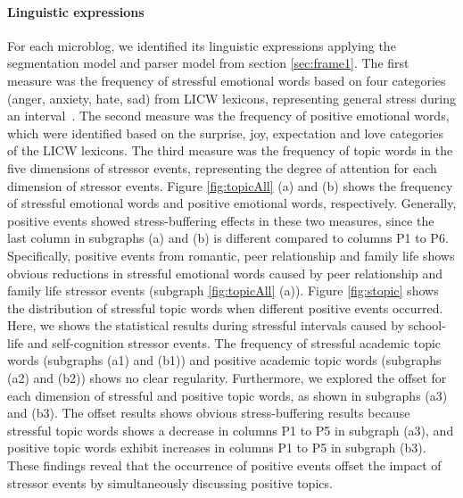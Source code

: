 \paragraph{\textbf{Linguistic expressions}}
For each microblog, we identified its linguistic expressions
applying the segmentation model and parser model from section \ref{sec:frame1}.
The first measure was the frequency of stressful emotional words based on four categories
(anger, anxiety, hate, sad) from LICW lexicons, representing general stress during an interval~\citep{Tausczik2010The}.
The second measure was the frequency of positive emotional words,
which were identified based on the surprise, joy, expectation and love categories of the LICW lexicons.
The third measure was the frequency of topic words in the five dimensions of stressor events,
representing the degree of attention for each dimension of stressor events.
Figure \ref{fig:topicAll} (a) and (b) shows the frequency of stressful emotional words and positive emotional words, respectively.
Generally, positive events showed stress-buffering effects in these two measures,
since the last column in subgraphs (a) and (b) is different compared to columns P1 to P6.
Specifically, positive events from romantic, peer relationship and family life shows obvious
reductions in stressful emotional words caused by
peer relationship and family life stressor events (subgraph \ref{fig:topicAll} (a)).
Figure \ref{fig:stopic} shows the distribution of stressful topic words when different positive events occurred.
Here, we shows the statistical results during stressful intervals caused by school-life and self-cognition stressor events.
The frequency of stressful academic topic words (subgraphs (a1) and (b1))
and positive academic topic words (subgraphs (a2) and (b2)) shows no clear regularity.
Furthermore, we explored the offset for each dimension of stressful and positive topic words,
as shown in subgraphs (a3) and (b3).
The offset results shows obvious stress-buffering results
because stressful topic words shows a decrease in columns P1 to P5 in subgraph (a3),
and positive topic words exhibit increases in columns P1 to P5 in subgraph (b3).
These findings reveal that the occurrence of positive events offset the impact of stressor events
by simultaneously discussing positive topics.

